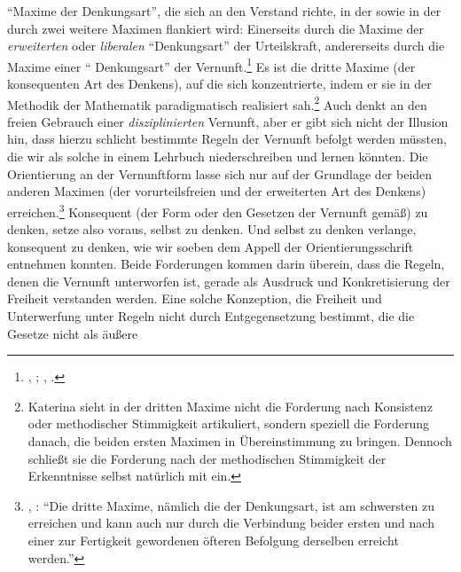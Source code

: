 \enquote{Maxime der  \punkt{} Denkungsart}, die sich an
den Verstand richte, in der  sowie in der
 durch zwei weitere Maximen
flankiert wird: Einerseits durch die Maxime der \emph{erweiterten} oder
\emph{liberalen} \enquote{Denkungsart} der Urteilskraft, andererseits durch die
Maxime einer \enquote{ Denkungsart} der
Vernunft.\footnote{\cite[Vgl.][\S~40]{Kant:KritikderUrteilskraft2009}, \cite[V:
294.14--295.19]{Kant:GesammelteWerke1900ff.};
\cite[BA~166\,f.]{Kant:AnthropologieinpragmatischerHinsicht1977}, \cite[VII:
228.27--229.2]{Kant:GesammelteWerke1900ff.}.} Es ist die dritte Maxime (der
konsequenten Art des Denkens), auf die  sich konzentrierte, indem er
sie in der Methodik der Mathematik paradigmatisch realisiert
sah.\footnote{Katerina
\textcite[vgl.][151]{Deligiorgi:UniversalisabilityPublicitaandCommunication2002}
sieht in der dritten Maxime nicht die Forderung nach Konsistenz oder
methodischer Stimmigkeit artikuliert, sondern speziell die Forderung danach, die
beiden ersten Maximen in Übereinstimmung zu bringen. Dennoch schließt sie die
Forderung nach der methodischen Stimmigkeit der Erkenntnisse selbst natürlich
mit ein.} Auch  denkt an den freien Gebrauch einer
\emph{disziplinierten} Vernunft, aber er gibt sich
nicht der Illusion hin, dass hierzu schlicht bestimmte Regeln der Vernunft
befolgt werden müssten, die wir als solche in einem Lehrbuch niederschreiben und
lernen könnten. Die Orientierung an der
Vernunftform lasse sich nur auf der Grundlage der beiden anderen Maximen (der
vorurteilsfreien und der erweiterten Art des Denkens)
erreichen.\footnote{\cite[Vgl.][\S~40]{Kant:KritikderUrteilskraft2009}, \cite[V:
295.14--17]{Kant:GesammelteWerke1900ff.}: \enquote{Die dritte Maxime, nämlich
die der  Denkungsart, ist am schwersten zu erreichen und kann auch
nur durch die Verbindung beider ersten und nach einer zur Fertigkeit gewordenen
öfteren Befolgung derselben erreicht werden.}}
Konsequent (der Form oder den Gesetzen der Vernunft gemäß) zu denken, setze also
voraus, selbst zu denken. Und selbst zu denken verlange, konsequent zu denken,
wie wir soeben dem Appell der Orientierungsschrift entnehmen konnten.
Beide Forderungen kommen darin überein, dass die Regeln, denen die Vernunft
unterworfen ist, gerade als Ausdruck und Konkretisierung der Freiheit
verstanden werden. Eine solche Konzeption, die Freiheit und Unterwerfung unter
Regeln nicht durch Entgegensetzung bestimmt, die die Gesetze nicht als äußere
